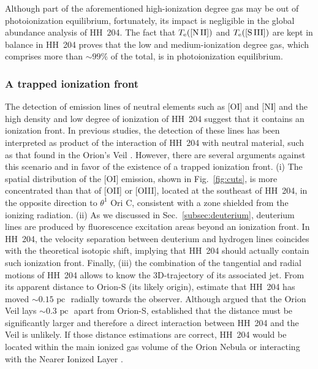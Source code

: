 \documentclass[twocolumn]{aastex63}
\newcommand{\cesar}[1]{{\color{red}C: #1}}
\begin{document}
Although part of the aforementioned high-ionization degree gas may be out of photoionization equilibrium, fortunately, its impact is negligible in the global abundance analysis of HH~204. The fact that $T_{\rm e}(\text{[N\thinspace II]})$ and $T_{\rm e}(\text{[S\thinspace III]})$ are kept in balance in HH~204 proves that the low and medium-ionization degree gas, which comprises more than $\sim 99\%$ of the total, is in photoionization equilibrium.

\subsubsection{A trapped ionization front}
\label{subsubsec:trapped_IF}

The detection of emission lines of neutral elements such as [O\thinspace I] and [N\thinspace I] and the high density and low degree of ionization of HH~204 suggest that it contains an ionization front. In previous studies, the detection of these lines has been interpreted as product of the interaction of HH~204 with neutral material, such as that found in the Orion's Veil \citep[][]{ODell:1997a,odell97,takami02}. However, there are several arguments against this scenario and in favor of the existence of a trapped ionization front. (i) The spatial distribution of the [O\thinspace I] emission, shown in Fig.~\ref{fig:cuts}, is more concentrated than that of [O\thinspace II] or [O\thinspace III], located at the southeast of HH~204, in the opposite direction to $\theta^{1} \text{ Ori C}$, consistent with a zone shielded from the ionizing radiation. (ii) As we discussed in Sec.~\ref{subsec:deuterium}, deuterium lines are produced by fluorescence excitation areas beyond an ionization front. In HH~204, the velocity separation between deuterium and hydrogen lines coincides with the theoretical isotopic shift, implying that HH~204 should  actually contain such ionization front. Finally, (iii) the combination of the tangential and radial motions of HH~204 allows to know the 3D-trajectory of its associated jet. From its apparent distance to Orion-S (its likely origin), \citet{Doi:2004a} estimate that HH~204 has moved $\sim 0.15 \text{ pc }$ radially towards the observer. Although \citet[][]{vanderWerf13} argued that the Orion Veil lays $\sim 0.3 \text{ pc }$ apart from Orion-S, \citet[][]{abel16} established that the distance must be significantly larger and therefore a direct interaction between HH~204 and the Veil is unlikely. If those distance estimations are correct, HH~204 would be located within the main ionized gas volume of the Orion Nebula or interacting with the Nearer Ionized Layer  \citep[NIL, see][]{Abel19,Odell20}. %
\end{document}
